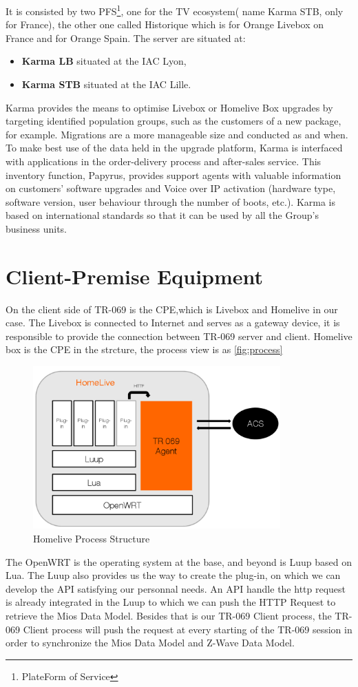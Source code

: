 It is consisted by two PFS\footnote{PlateForm of Service}, one for the TV ecosystem( name Karma STB, only for France), the other one called Historique which is for Orange Livebox on France and for Orange Spain. The server are situated at:
\begin{itemize}
	\item \textbf{Karma LB} situated at the IAC Lyon,
	\item \textbf{Karma STB} situated at the IAC Lille.
\end{itemize}

Karma provides the means to optimise Livebox or Homelive Box upgrades by targeting identified population groups, such as the customers of a new package, for example. Migrations are a more manageable size and conducted as and when. To make best use of the data held in the upgrade platform, Karma is interfaced with applications in the order-delivery process and after-sales service. This inventory function, Papyrus, provides support agents with valuable information on customers’ software upgrades and Voice over IP activation (hardware type, software version, user behaviour through the number of boots, etc.). Karma is based on international standards so that it can be used by all the Group’s business units.

\section{Client-Premise Equipment}
On the client side of TR-069 is the CPE,which is Livebox and Homelive in our case. The Livebox is connected to Internet and serves as a gateway device, it is responsible to provide the connection between TR-069 server and client. Homelive box is the CPE in the strcture, the process view is as \autoref{fig:process}

\begin{figure}[htbp]
	\centering
		\includegraphics[width=9.5cm]{Figures/process.png}
	\caption[Homelive Process Structure]{Homelive Process Structure}
	\label{fig:process}
\end{figure}

The OpenWRT is the operating system at the base, and beyond is Luup based on Lua. The Luup also provides us the way to create the plug-in, on which we can develop the API satisfying our personnal needs. An API handle the http request is already integrated in the Luup to which we can push the HTTP Request to retrieve the Mios Data Model. Besides that is our TR-069 Client process, the TR-069 Client process will push the request at every starting of the TR-069 session in order to synchronize the Mios Data Model and Z-Wave Data Model.
